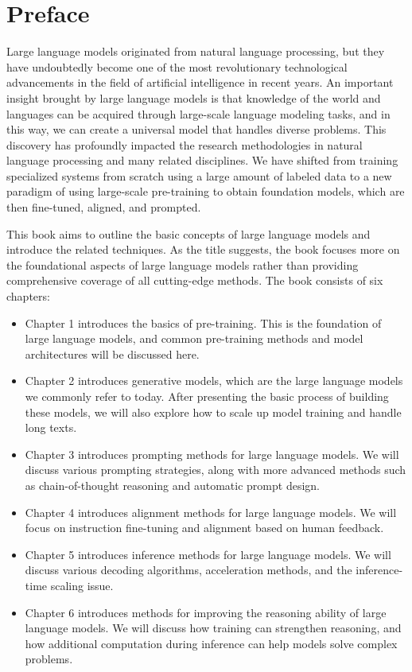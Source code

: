 \chapter*{Preface}

\vspace{0.5em}
Large language models originated from natural language processing, but they have undoubtedly become one of the most revolutionary technological advancements in the field of artificial intelligence in recent years. An important insight brought by large language models is that knowledge of the world and languages can be acquired through large-scale language modeling tasks, and in this way, we can create a universal model that handles diverse problems. This discovery has profoundly impacted the research methodologies in natural language processing and many related disciplines. We have shifted from training specialized systems from scratch using a large amount of labeled data to a new paradigm of using large-scale pre-training to obtain foundation models, which are then fine-tuned, aligned, and prompted.

This book aims to outline the basic concepts of large language models and introduce the related techniques. As the title suggests, the book focuses more on the foundational aspects of large language models rather than providing comprehensive coverage of all cutting-edge methods. The book consists of six chapters:

\begin{itemize}
\item Chapter 1 introduces the basics of pre-training. This is the foundation of large language models, and common pre-training methods and model architectures will be discussed here.
\item Chapter 2 introduces generative models, which are the large language models we commonly refer to today. After presenting the basic process of building these models, we will also explore how to scale up model training and handle long texts.
\item Chapter 3 introduces prompting methods for large language models. We will discuss various prompting strategies, along with more advanced methods such as chain-of-thought reasoning and automatic prompt design.
\item Chapter 4 introduces alignment methods for large language models. We will focus on instruction fine-tuning and alignment based on human feedback.
\item Chapter 5 introduces inference methods for large language models. We will discuss various decoding algorithms, acceleration methods, and the inference-time scaling issue.
\item Chapter 6 introduces methods for improving the reasoning ability of large language models. We will discuss how training can strengthen reasoning, and how additional computation during inference can help models solve complex problems.
\end{itemize}

